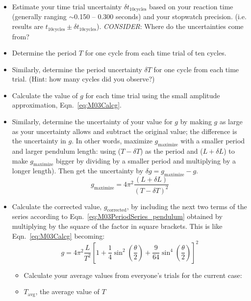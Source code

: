 \begin{enumerate}
\begin{itemize}
\begin{itemize}
    \end{itemize}
  \item Estimate your time trial uncertainty $\delta t_{10\text{cycles}}$ based on your reaction time (generally ranging $\sim$0.150 -- 0.300 seconds) and your stopwatch precision. (i.e. results are $t_{10\text{cycles}} \pm \delta t_{10\text{cycles}}$). \textit{CONSIDER}: Where do the uncertainties come from?
  \item Determine the period $T$ for one cycle from each time trial of ten cycles.
  \item Similarly, determine the period uncertainty $\delta T$ for one cycle from each time trial. (Hint: how many cycles did you observe?)
  \item Calculate the value of $g$ for each time trial using the small amplitude approximation, Eqn.~\ref{eq:M03Calcg}.
  \item Similarly, determine the uncertainty of your value for $g$ by making $g$ as large as your uncertainty allows and subtract the original value; the difference is the uncertainty in $g$. In other words, maximize $g_{\text{maximize}}$ with a smaller period and larger pendulum length: using ($T - \delta T$) as the period and ($L + \delta L$) to make $g_{\text{maximize}}$ bigger by dividing by a smaller period and multiplying by a longer length). Then get the uncertainty by $\delta g = g_{\text{maximize}} - g$.
  \subitem \begin{equation}
  \label{eq:M03Calcg_subitem_maximized}
  g_{\text{maximize}} = 4\pi^2 \frac{(L + \delta L)}{(T - \delta T)^2}
\end{equation}
\item Calculate the corrected value, $g_\text{corrected}$, by including the next two terms of the series according to Eqn.~\ref{eq:M03PeriodSeries_pendulum} obtained by multiplying by the square of the factor in square brackets. This is like Eqn.~\ref{eq:M03Calcg} becoming:
  \subitem \begin{equation}
  \label{eq:M03Calcg_subitem_corrected}
  g = 4\pi^2 \frac{L}{T^2} \left[ 1 +
  \frac{1}{ 4} \sin^2\left(\frac{\theta}{2}\right) +
  \frac{9}{64} \sin^4\left(\frac{\theta}{2}\right) \right]^2
\end{equation}
  \begin{itemize}
  \item Calculate your average values from everyone's trials for the current case:
      \item $T_\text{avg}$, the average value of $T$

\end{itemize}
\end{itemize}
\end{enumerate}

